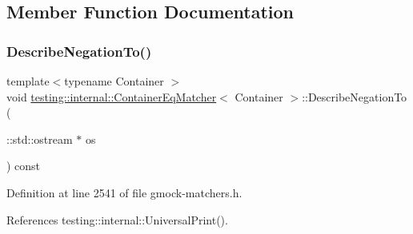 \subsection{Member Function Documentation}
\mbox{\label{classtesting_1_1internal_1_1ContainerEqMatcher_a3dc9e61b6aff65039325138dccccb8ec}} 
\subsubsection{\texorpdfstring{Describe\+Negation\+To()}{DescribeNegationTo()}}
{\footnotesize\ttfamily template$<$typename Container $>$ \\
void \hyperlink{classtesting_1_1internal_1_1ContainerEqMatcher}{testing\+::internal\+::\+Container\+Eq\+Matcher}$<$ Container $>$\+::Describe\+Negation\+To (\begin{DoxyParamCaption}\item[{\+::std\+::ostream $\ast$}]{os }\end{DoxyParamCaption}) const\hspace{0.3cm}{\ttfamily [inline]}}



Definition at line 2541 of file gmock-\/matchers.\+h.



References testing\+::internal\+::\+Universal\+Print().


